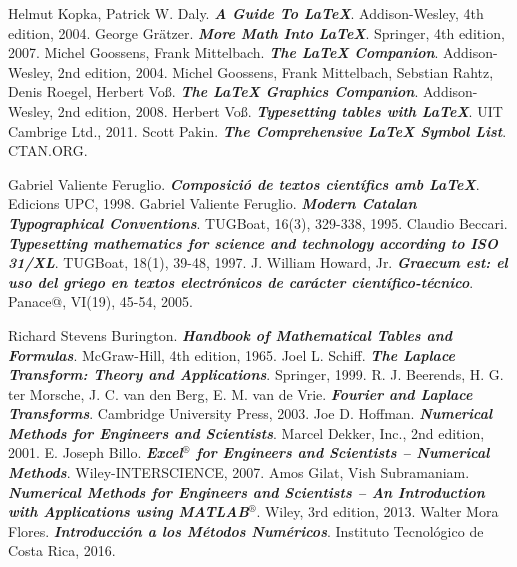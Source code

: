 \begin{thebibliography}{99}


     Helmut Kopka, Patrick W. Daly. \textbf{\textit{A Guide To \LaTeX}}.  Addison-Wesley, 4th edition, 2004.
     George Grätzer. \textbf{\textit{More Math Into \LaTeX}}.  Springer, 4th edition, 2007.
     Michel Goossens, Frank Mittelbach. \textbf{\textit{The \LaTeX{} Companion}}.  Addison-Wesley, 2nd edition, 2004.
     Michel Goossens, Frank Mittelbach, Sebstian Rahtz, Denis Roegel, Herbert Voß. \textbf{\textit{The \LaTeX{} Graphics Companion}}.  Addison-Wesley, 2nd edition, 2008.
     Herbert Voß. \textbf{\textit{Typesetting tables with \LaTeX{}}}.  UIT Cambrige Ltd., 2011.
     Scott Pakin. \textbf{\textit{The Comprehensive \LaTeX{} Symbol List}}. CTAN.ORG.

     Gabriel Valiente Feruglio. \textbf{\textit{Composició de textos científics amb \LaTeX}}.  Edicions UPC, 1998.
     Gabriel Valiente Feruglio. \textbf{\textit{Modern Catalan Typographical Conventions}}.  TUGBoat, 16(3), 329-338, 1995.
     Claudio Beccari. \textbf{\textit{Typesetting mathematics for science and technology according to ISO 31/XL}}.  TUGBoat, 18(1), 39-48, 1997.
     J. William Howard, Jr. \textbf{\textit{Graecum est: el uso del griego en textos electrónicos de carácter científico-técnico}}.  Panace@, VI(19), 45-54, 2005.

     Richard Stevens Burington. \textbf{\textit{Handbook of Mathematical Tables and Formulas}}.  McGraw-Hill, 4th edition, 1965.
     Joel L. Schiff. \textbf{\textit{The Laplace Transform: Theory and Applications}}.  Springer, 1999.
     R. J. Beerends, H. G. ter Morsche, J. C. van den Berg, E. M. van de Vrie. \textbf{\textit{Fourier and Laplace Transforms}}.  Cambridge University Press, 2003.
     Joe D. Hoffman. \textbf{\textit{Numerical Methods for Engineers and Scientists}}.  Marcel Dekker, Inc., 2nd edition, 2001.
     E. Joseph Billo. \textbf{\textit{Excel${}^\circledR$ for Engineers and Scientists -- Numerical Methods}}.  Wiley-INTERSCIENCE, 2007.
     Amos Gilat, Vish Subramaniam. \textbf{\textit{Numerical Methods for Engineers and Scientists --
        An Introduction with Applications using MATLAB${}^\circledR$}}.  Wiley, 3rd edition, 2013.
     Walter Mora Flores. \textbf{\textit{Introducción a los Métodos Numéricos}}.  Instituto Tecnológico de Costa Rica, 2016.


\end{thebibliography}
